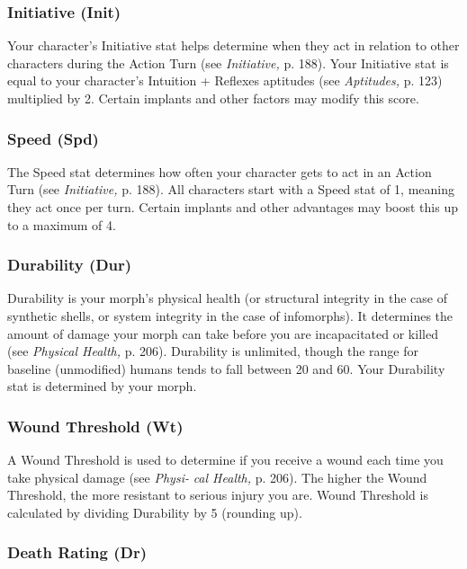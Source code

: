 \subsubsection{Initiative (Init)}

Your character's Initiative stat helps determine when 
they act in relation to other characters during the 
Action Turn (see \textit{Initiative,} p. 188). Your Initiative stat 
is equal to your character's Intuition + Reflexes aptitudes
(see \textit{Aptitudes,} p. 123) multiplied by 2. Certain
implants and other factors may modify this score.

\subsubsection{Speed (Spd)}

The Speed stat determines how often your character 
gets to act in an Action Turn (see \textit{Initiative,} p. 188). 
All characters start with a Speed stat of 1, meaning 
they act once per turn. Certain implants and other 
advantages may boost this up to a maximum of 4.

\subsubsection{Durability (Dur)}

Durability is your morph's physical health (or structural
integrity in the case of synthetic shells, or system
integrity in the case of infomorphs). It determines the 
amount of damage your morph can take before you are 
incapacitated or killed (see \textit{Physical Health,} p. 206).
Durability is unlimited, though the range for baseline
(unmodified) humans tends to fall between 20 and
60. Your Durability stat is determined by your morph.

\subsubsection{Wound Threshold (Wt)}

A Wound Threshold is used to determine if you receive a 
wound each time you take physical damage (see \textit{Physi-}
\textit{cal Health,} p. 206). The higher the Wound Threshold, 
the more resistant to serious injury you are.
Wound Threshold is calculated by dividing Durability
by 5 (rounding up).

\subsubsection{Death Rating (Dr)}

